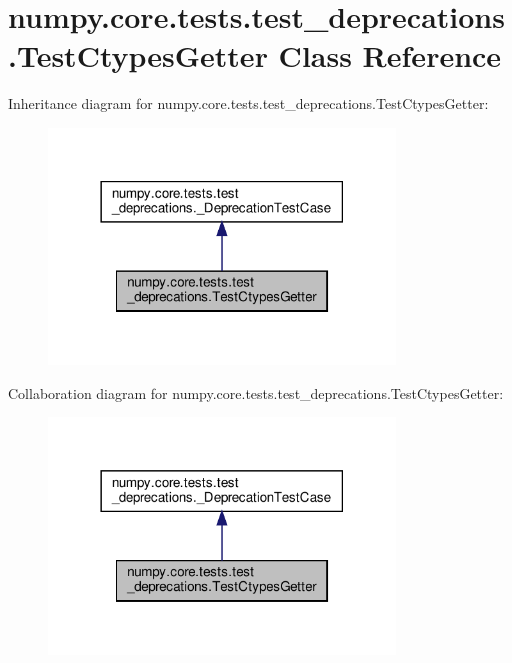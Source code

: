 \hypertarget{classnumpy_1_1core_1_1tests_1_1test__deprecations_1_1TestCtypesGetter}{}\section{numpy.\+core.\+tests.\+test\+\_\+deprecations.\+Test\+Ctypes\+Getter Class Reference}
\label{classnumpy_1_1core_1_1tests_1_1test__deprecations_1_1TestCtypesGetter}


Inheritance diagram for numpy.\+core.\+tests.\+test\+\_\+deprecations.\+Test\+Ctypes\+Getter\+:
\nopagebreak
\begin{figure}[H]
\begin{center}
\leavevmode
\includegraphics[width=261pt]{classnumpy_1_1core_1_1tests_1_1test__deprecations_1_1TestCtypesGetter__inherit__graph}
\end{center}
\end{figure}


Collaboration diagram for numpy.\+core.\+tests.\+test\+\_\+deprecations.\+Test\+Ctypes\+Getter\+:
\nopagebreak
\begin{figure}[H]
\begin{center}
\leavevmode
\includegraphics[width=261pt]{classnumpy_1_1core_1_1tests_1_1test__deprecations_1_1TestCtypesGetter__coll__graph}
\end{center}
\end{figure}
